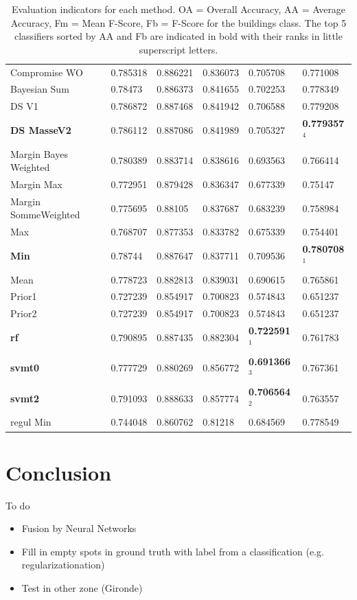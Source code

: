 \documentclass[10pt]{article}
\begin{document}
\begin{table}[H]
\begin{tabular}{llllll}
Compromise WO & 0.785318 & 0.886221 & 0.836073 & 0.705708 & 0.771008\\
Bayesian Sum & 0.78473 & 0.886373 & 0.841655 & 0.702253 & 0.778349\\
DS V1 & 0.786872 & 0.887468 & 0.841942 & 0.706588 & 0.779208\\
\textbf{DS MasseV2} & 0.786112 & 0.887086 & 0.841989 & 0.705327 & \textbf{0.779357$^4$}\\
Margin Bayes Weighted & 0.780389 & 0.883714 & 0.838616 & 0.693563 & 0.766414\\
Margin Max & 0.772951 & 0.879428 & 0.836347 & 0.677339 & 0.75147\\
Margin SommeWeighted & 0.775695 & 0.88105 & 0.837687 & 0.683239 & 0.758984\\
Max & 0.768707 & 0.877353 & 0.833782 & 0.675339 & 0.754401\\
\textbf{Min} & 0.78744 & 0.887647 & 0.837711 & 0.709536 & \textbf{0.780708$^1$}\\
Mean & 0.778723 & 0.882813 & 0.839031 & 0.690615 & 0.765861\\
Prior1 & 0.727239 & 0.854917 & 0.700823 & 0.574843 & 0.651237\\
Prior2 & 0.727239 & 0.854917 & 0.700823 & 0.574843 & 0.651237\\\hline
\textbf{rf} & 0.790895 & 0.887435 & 0.882304 & \textbf{0.722591$^1$} & 0.761783\\
\textbf{svmt0} & 0.777729 & 0.880269 & 0.856772 & \textbf{0.691366$^3$} & 0.767361\\
\textbf{svmt2} & 0.791093 & 0.888633 & 0.857774 & \textbf{0.706564$^2$} & 0.763557\\\hline
regul Min & 0.744048 & 0.860762 & 0.81218 & 0.684569 & 0.778549\\\bottomrule
\end{tabular}
\caption{Evaluation indicators for each method. OA = Overall Accuracy, AA = Average Accuracy, Fm = Mean F-Score, Fb = F-Score for the buildings class. The top 5 classifiers sorted by AA and Fb are indicated in bold with their ranks in little superscript letters.}
\label{table:eval}
\end{table}
\newpage
\section{Conclusion}
To do 
\begin{itemize}
    \item Fusion by Neural Networks
    \item Fill in empty spots in ground truth with label from a classification (e.g. regularizationation)
    \item Test in other zone (Gironde)
\end{itemize}
\pagebreak
\printbibliography[heading=bibintoc,heading=bibnumbered]
\end{document}

